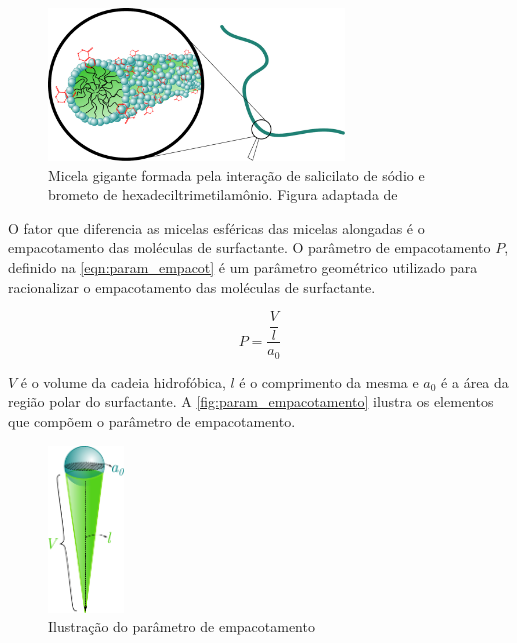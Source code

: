 	\begin{figure}[h]
		\centering
		\includegraphics[width=0.7\textwidth]{./imagens/introducao/micela_gigante}
		\caption{Micela gigante formada pela interação de salicilato de sódio e brometo de hexadeciltrimetilamônio. Figura adaptada de \citeauthor{WLM_Advances}}
		\label{fig:micela_gigante}
	\end{figure}
	
	O fator que diferencia as micelas esféricas das micelas alongadas é o empacotamento das moléculas de surfactante. O parâmetro de empacotamento \(P\), definido na \autoref{eqn:param_empacot} é um parâmetro geométrico utilizado para racionalizar o empacotamento das moléculas de surfactante.\cite{Israelachvili1976c}
	
	\begin{equation}
	P = \dfrac{\dfrac{V}{l}}{a_0}
	\label{eqn:param_empacot}
	\end{equation} 
	
	\(V\) é o volume da cadeia hidrofóbica, \(l\) é o comprimento da mesma e \(a_0\) é a área da região polar do surfactante. A \autoref{fig:param_empacotamento} ilustra os elementos que compõem o parâmetro de empacotamento.
	
	\begin{figure}[h]
		\centering
		\includegraphics[width=2cm]{imagens/introducao/param_empacotamento}
		\caption{Ilustração do parâmetro de empacotamento}
		\label{fig:param_empacotamento}
	\end{figure}
	
